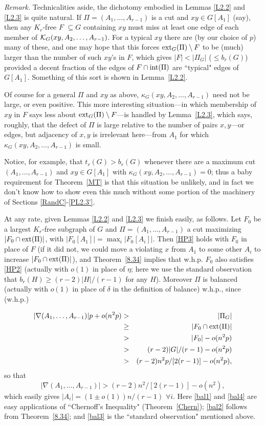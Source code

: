 \documentclass[letterpaper,11pt]{article}
\newcommand{\mn}[0]{\medskip\noindent}
\newcommand{\sub}[0]{\subseteq}
\newcommand{\sm}[0]{\setminus}
\renewcommand{\dots}[0]{,\ldots,}
\newcommand{\K}[0]{{\cal K}}
\newcommand{\ext}[0]{{\rm ext}}
\newcommand{\0}[0]{\emptyset}
\newcommand{\gd}[0]{\delta }
\begin{document}
\mn
{\em Remark.}
Technicalities aside, the dichotomy embodied in
Lemmas \ref{L2.2} and \ref{L2.3} is quite natural.
If $\Pi=(A_1\dots A_{r-1})$ is a cut and
$xy\in G[A_1]$ (say), then any
$K_r$-free $F$ $\sub G$ containing $xy$ must miss
at least one edge of each member of $ \K_G(xy,A_2\dots A_{r-1})$.
For a typical $xy$ there are (by our choice of $p$) many
of these, and one may hope that this forces
$\ext_G(\Pi)\sm F$ to be (much)
larger than the number of such $xy$'s in $F$,
which gives $|F|< |\Pi_G|$ ($\leq b_r(G)$) provided
a decent fraction of the edges of
$F\cap {\rm int}(\Pi)$ are ``typical" edges of $G[A_1]$.
Something of this sort is shown in Lemma~\ref{L2.2}.




Of course for a general $\Pi $ and
$xy$ as above,
$ \kappa_G(xy,A_2\dots A_{r-1})$ need not be large, or even
positive.
This more interesting situation---in which
membership of $xy$ in $F$ says
less about $\ext_G(\Pi)\sm F$---is handled by
Lemma~\ref{L2.3}, which says, roughly, that the defect of $\Pi$
is large relative to the number of
pairs $x,y$---or edges, but adjacency of $x,y$
is irrelevant here---from $A_1$ for which
$ \kappa_G(xy,A_2\dots A_{r-1})$ is small.

Notice, for example, that $t_r(G)>b_r(G)$ whenever there are a maximum
cut $(A_1\dots A_{r-1})$ and $xy\in G[A_1]$ with
$ \kappa_G(xy,A_2\dots A_{r-1})=0$; thus a baby requirement for
Theorem~\ref{MT} is that this situation be unlikely, and
in fact we don't know how to show even this much without some
portion of the machinery of Sections \ref{RandC}-\ref{PL2.3'}.


\medskip
At any rate,
given Lemmas \ref{L2.2} and \ref{L2.3} we finish easily,
as follows.
%
Let $F_0$ be a largest $K_r$-free subgraph of $G$ and
$\Pi=(A_1\dots A_{r-1})$
a cut maximizing $|F_0\cap \ext(\Pi)|$, with
$|F_0[A_1]|=\max_i |F_0[A_i]|$.
Then \eqref{HP3} holds
with $F_0$ in place of $F$ (if it did not,
we could move a violating
$x$ from $A_1$ to some other $A_i$
to increase $|F_0\cap \ext(\Pi)|$),
and Theorem~\ref{8.34} implies that w.h.p.
$F_0$ also satisfies \eqref{HP2} (actually with $o(1)$ in place of $\eta$;
here we use the standard observation that
$b_r(H)\geq (r-2)|H|/(r-1)$ for any $H$).
Moreover $\Pi$ is balanced (actually with $o(1)$
in place of $\gd$ in the definition of balance)
w.h.p., since (w.h.p.)

\begin{eqnarray}
|\nabla(A_1\dots A_{r-1})|p +o(n^2p)
&>&
|\Pi_G| \label{bal1}\\
&\geq &|F_0\cap \ext(\Pi)|\nonumber\\
&>&|F_0| -o(n^2p)\label{bal2} \\
&> &(r-2)|G|/(r-1)-o(n^2p)\label{bal3}\\
&> &(r-2)n^2p/[2(r-1)]-o(n^2p)\label{bal4},
\end{eqnarray}
so that
\[
|\nabla(A_1\dots A_{r-1})| >(r-2)n^2/[2(r-1)]-o(n^2),
\]
which easily gives $|A_i|= (1\pm o(1))n/(r-1)$ $\forall i$.
%
Here \eqref{bal1} and \eqref{bal4} are easy applications of
``Chernoff's Inequality" (Theorem~\ref{Chern});
\eqref{bal2} follows from Theorem~\ref{8.34};
and \eqref{bal3} is the ``standard observation" mentioned above.
\end{document}
